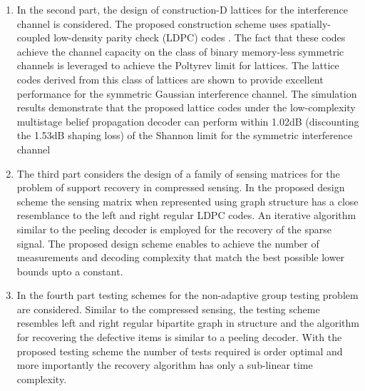 \begin{enumerate}
\item In the second part, the design of construction-D lattices for the interference channel is considered. The proposed construction scheme uses spatially-coupled low-density parity check (LDPC) codes \cite{felstrom1999time,kudekar2011threshold}. The fact that these codes achieve the channel capacity on the class of binary memory-less symmetric channels is leveraged to achieve the Poltyrev limit for lattices. The lattice codes derived from this class of lattices are shown to provide excellent performance for the symmetric Gaussian interference channel. The simulation results demonstrate that the proposed lattice codes under the low-complexity multistage belief propagation decoder can perform within 1.02dB (discounting the 1.53dB shaping loss) of the Shannon limit for the symmetric interference channel 

\item The third part considers the design of a family of sensing matrices for the problem of support recovery in compressed sensing. In the proposed design scheme the sensing matrix when represented using graph structure has a close resemblance to the left and right regular LDPC codes. An iterative algorithm similar to the peeling decoder is employed for the recovery of the sparse signal. The proposed design scheme enables to achieve the number of measurements and decoding complexity that match the best possible lower bounds upto a constant.%
  

\item In the fourth part testing schemes for the non-adaptive group testing problem are considered. Similar to the compressed sensing, the testing scheme resembles left and right regular bipartite graph in structure and the algorithm for recovering the defective items is similar to a peeling decoder. With the proposed testing scheme the number of tests required is order optimal and more importantly the recovery algorithm has only a sub-linear time complexity.
\end{enumerate} 
\pagebreak{}
